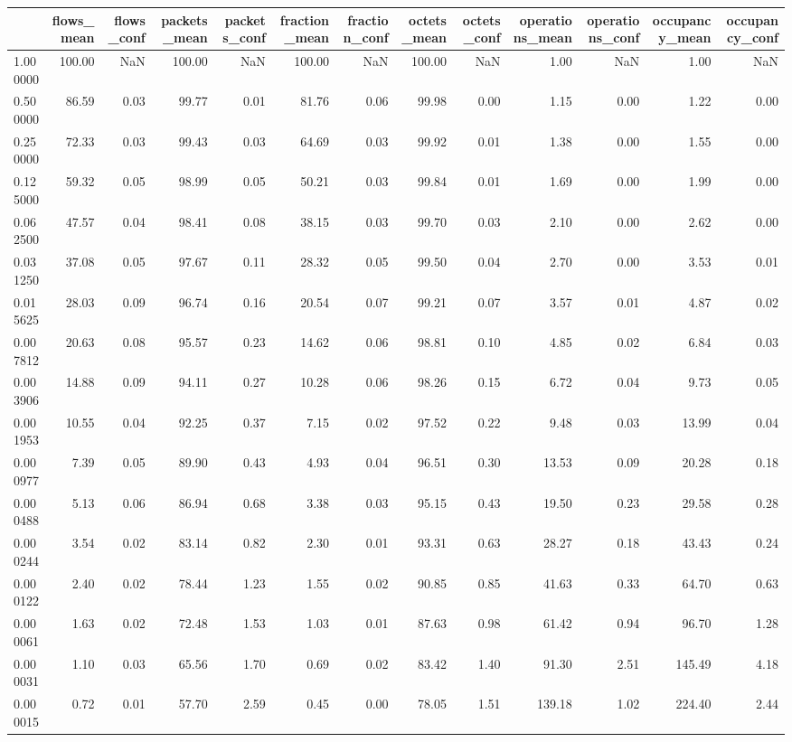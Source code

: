 \begin{tabular}{lrrrrrrrrrrrr}
\toprule
 & flows_mean & flows_conf & packets_mean & packets_conf & fraction_mean & fraction_conf & octets_mean & octets_conf & operations_mean & operations_conf & occupancy_mean & occupancy_conf \\
\midrule
1.000000 & 100.00 & NaN & 100.00 & NaN & 100.00 & NaN & 100.00 & NaN & 1.00 & NaN & 1.00 & NaN \\
0.500000 & 86.59 & 0.03 & 99.77 & 0.01 & 81.76 & 0.06 & 99.98 & 0.00 & 1.15 & 0.00 & 1.22 & 0.00 \\
0.250000 & 72.33 & 0.03 & 99.43 & 0.03 & 64.69 & 0.03 & 99.92 & 0.01 & 1.38 & 0.00 & 1.55 & 0.00 \\
0.125000 & 59.32 & 0.05 & 98.99 & 0.05 & 50.21 & 0.03 & 99.84 & 0.01 & 1.69 & 0.00 & 1.99 & 0.00 \\
0.062500 & 47.57 & 0.04 & 98.41 & 0.08 & 38.15 & 0.03 & 99.70 & 0.03 & 2.10 & 0.00 & 2.62 & 0.00 \\
0.031250 & 37.08 & 0.05 & 97.67 & 0.11 & 28.32 & 0.05 & 99.50 & 0.04 & 2.70 & 0.00 & 3.53 & 0.01 \\
0.015625 & 28.03 & 0.09 & 96.74 & 0.16 & 20.54 & 0.07 & 99.21 & 0.07 & 3.57 & 0.01 & 4.87 & 0.02 \\
0.007812 & 20.63 & 0.08 & 95.57 & 0.23 & 14.62 & 0.06 & 98.81 & 0.10 & 4.85 & 0.02 & 6.84 & 0.03 \\
0.003906 & 14.88 & 0.09 & 94.11 & 0.27 & 10.28 & 0.06 & 98.26 & 0.15 & 6.72 & 0.04 & 9.73 & 0.05 \\
0.001953 & 10.55 & 0.04 & 92.25 & 0.37 & 7.15 & 0.02 & 97.52 & 0.22 & 9.48 & 0.03 & 13.99 & 0.04 \\
0.000977 & 7.39 & 0.05 & 89.90 & 0.43 & 4.93 & 0.04 & 96.51 & 0.30 & 13.53 & 0.09 & 20.28 & 0.18 \\
0.000488 & 5.13 & 0.06 & 86.94 & 0.68 & 3.38 & 0.03 & 95.15 & 0.43 & 19.50 & 0.23 & 29.58 & 0.28 \\
0.000244 & 3.54 & 0.02 & 83.14 & 0.82 & 2.30 & 0.01 & 93.31 & 0.63 & 28.27 & 0.18 & 43.43 & 0.24 \\
0.000122 & 2.40 & 0.02 & 78.44 & 1.23 & 1.55 & 0.02 & 90.85 & 0.85 & 41.63 & 0.33 & 64.70 & 0.63 \\
0.000061 & 1.63 & 0.02 & 72.48 & 1.53 & 1.03 & 0.01 & 87.63 & 0.98 & 61.42 & 0.94 & 96.70 & 1.28 \\
0.000031 & 1.10 & 0.03 & 65.56 & 1.70 & 0.69 & 0.02 & 83.42 & 1.40 & 91.30 & 2.51 & 145.49 & 4.18 \\
0.000015 & 0.72 & 0.01 & 57.70 & 2.59 & 0.45 & 0.00 & 78.05 & 1.51 & 139.18 & 1.02 & 224.40 & 2.44 \\

\end{tabular}
